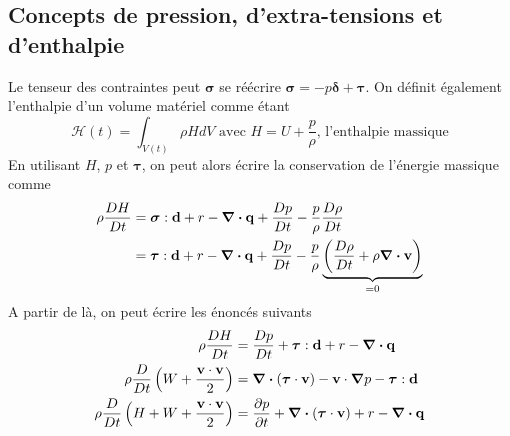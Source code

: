 \documentclass[a4paper,11pt]{report}
\newcommand{\dvm}[2]{\frac{D #1}{D #2}}
\begin{document}
      \subsection{Concepts de pression, d'extra-tensions et d'enthalpie}
        Le tenseur des contraintes peut $\boldsymbol{\sigma}$ se réécrire $\boldsymbol{\sigma} = -p \boldsymbol{\delta} + \boldsymbol{\tau}$. On définit également l'enthalpie d'un volume matériel comme étant
        \begin{equation}
          \mathcal{H}(t) = \int_{V(t)} \rho H dV \textrm{ avec } H = U + \frac{p}{\rho}\textrm{, l'enthalpie massique}
        \end{equation}
        En utilisant $H$, $p$ et $\boldsymbol{\tau}$, on peut alors écrire la conservation de l'énergie massique comme
        \begin{align}
          \rho \dvm{H}{t} &= \boldsymbol{\sigma} : \vb{d} + r - \div \vb{q} +  \dvm{p}{t} - \frac{p}{\rho}\dvm{\rho}{t}\nonumber\\
          &= \boldsymbol{\tau} : \vb{d} + r - \div \vb{q} + \dvm{p}{t} - \frac{p}{\rho} \underbrace{\left(\dvm{\rho}{t} + \rho \div \vb{v} \right)}_{=0}
        \end{align}
        A partir de là, on peut écrire les énoncés suivants
        \begin{align}
          \rho \dvm{H}{t} &= \dvm{p}{t} + \boldsymbol{\tau} : \vb{d} + r - \div \vb{q}\nonumber\\
          \rho \dvm{}{t}\left(W + \frac{\vb{v}\cdot\vb{v}}{2}\right) &= \div (\boldsymbol{\tau} \cdot \vb{v}) - \vb{v} \cdot \grad p - \boldsymbol{\tau} : \vb{d} \\
          \rho \dvm{}{t}\left(H + W + \frac{\vb{v}\cdot\vb{v}}{2}\right) &= \pdv{p}{t} + \div (\boldsymbol{\tau} \cdot \vb{v}) + r - \div \vb{q} \nonumber
        \end{align}

\begin{appendix}

\end{appendix}
\end{document}
